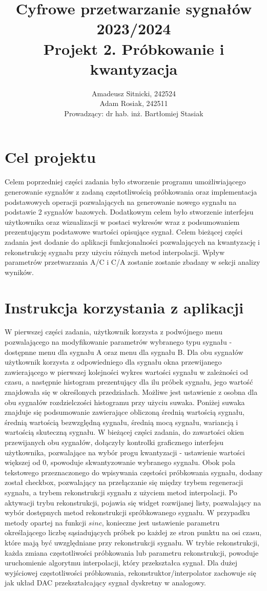 \documentclass{article}
\author{
	{Amadeusz Sitnicki, 242524} \\
	{Adam Rosiak, 242511}\\
{Prowadzący: dr hab. inż. Bartłomiej Stasiak}
}
\title{Cyfrowe przetwarzanie sygnałów 2023/2024\\Projekt 2. Próbkowanie i kwantyzacja}
\begin{document}
\maketitle
\section{Cel projektu}
\indent\indent Celem poprzedniej części zadania było stworzenie programu umożliwiającego generowanie sygnałów z zadaną częstotliwością próbkowania oraz implementacja podstawowych operacji pozwalających na generowanie nowego sygnału na podstawie 2 sygnałów bazowych. Dodatkowym celem było stworzenie interfejsu użytkownika oraz wizualizacji w postaci wykresów wraz z podsumowaniem prezentującym podstawowe wartości opisujące sygnał.
\newline
\indent Celem bieżącej części zadania jest dodanie do aplikacji funkcjonalności pozwalających na kwantyzację i rekonstrukcję sygnału przy użyciu różnych metod interpolacji. Wpływ parametrów przetwarzania A/C i C/A zostanie zostanie zbadany w sekcji analizy wyników. 

\section{Instrukcja korzystania z aplikacji}
\indent\indent W pierwszej części zadania, użytkownik korzysta z podwójnego menu pozwalającego na modyfikowanie parametrów wybranego typu sygnału - dostępnne menu dla sygnału A oraz menu dla sygnału B. Dla obu sygnałów użytkownik korzysta z odpowiedniego dla sygnału okna przewijanego zawierającego w pierwszej kolejności wykres wartości sygnału w zależności od czasu, a następnie histogram prezentujący dla ilu próbek sygnału, jego wartość znajdowała się w określonych przedziałach. Możliwe jest ustawienie z osobna dla obu sygnałów rozdzielczości histogramu przy użyciu suwaka. Poniżej suwaka znajduje się podsumowanie zawierające obliczoną średnią wartością sygnału, średnią wartością bezwzględną sygnału, średnią mocą sygnału, wariancją i wartością skuteczną sygnału. 
\newline
\indent W bieżącej części zadania, do zawartości okien przewijanych obu sygnałów, dołączyły kontrolki graficznego interfejsu użytkownika, pozwalające na wybór progu kwantyzacji - ustawienie wartości większej od 0, spowoduje skwantyzowanie wybranego sygnału. Obok pola tekstowego przeznaczonego do wpisywania częstości próbkowania sygnału, dodany został checkbox, pozwalający na przełączanie się między trybem regeneracji sygnału, a trybem rekonstrukcji sygnału z użyciem metod interpolacji. Po aktywacji trybu rekonstrukcji, pojawia się widget rozwijanej listy, pozwalający na wybór dostępnych metod rekonstrukcji spróbkowanego sygnału. W przypadku metody opartej na funkcji $sinc$, konieczne jest ustawienie parametru określającego liczbę sąsiadujących próbek po każdej ze stron punktu na osi czasu, które mają być uwzględniane przy rekonstrukcji sygnału. W trybie rekonstrukcji, każda zmiana częstotliwości próbkowania lub parametru rekonstrukcji, powoduje uruchomienie algorytmu interpolacji, który przekształca sygnał. Dla dużej wyjściowej częstotliwości próbkowania, rekonstruktor/interpolator zachowuje się jak układ DAC przekształcający sygnał dyskretny w analogowy.   
\end{document}
